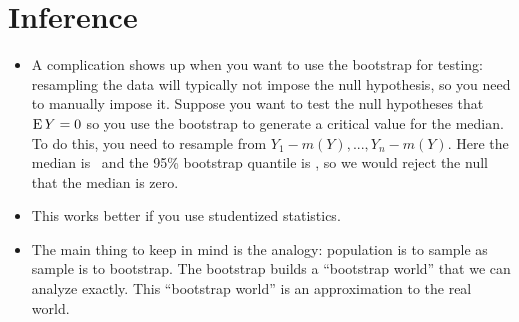 \section{Inference}

\begin{itemize}[leftmargin=0pt]

\item A complication shows up when you want to use the bootstrap for
  testing: resampling the data will typically not impose the null
  hypothesis, so you need to manually impose it.  Suppose you want to
  test the null hypotheses that $\operatorname{E} Y = 0$ so you use the bootstrap to
  generate a critical value for the median.  To do this, you need to
  resample from $Y_1 - m(Y),...,Y_n - m(Y)$.
  \renewcommand*\FancyVerbStartString{## block 6}
  Here the median is \ymedian\ and the 95\% bootstrap quantile is
  \bootinference, so we would reject the null that the median is zero.

\item This works better if you use studentized statistics.
  
\item The main thing to keep in mind is the analogy: population is to
  sample as sample is to bootstrap.  The bootstrap builds a
  ``bootstrap world'' that we can analyze exactly.  This ``bootstrap
  world'' is an approximation to the real world.

\end{itemize}


